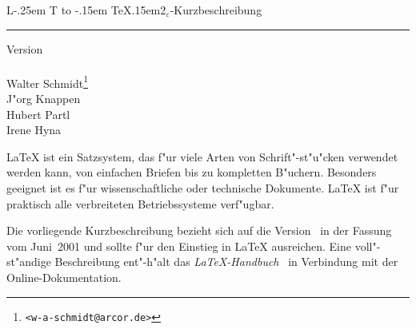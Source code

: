 \documentclass[11pt,a4paper]{article} %
\makeatletter
\DeclareRobustCommand{\sbLaTeXe}{{\fontseries{sbc}\selectfont\boldmath%
        L\kern-.25em%
        {\sbox\z@ T%
         \vbox to\ht\z@{\hbox{\check@mathfonts
                              \fontsize\sf@size\z@
                              \math@fontsfalse\selectfont
                              A}%
                        \vss}%
        }%
        \kern-.15em%
        \TeX\kern.15em2$_{\textstyle\varepsilon}$}}
\newcommand{\manual}{\emph{\LaTeX-Handbuch}~\cite{manual}}
\makeatother
\begin{document}
\begin{titlepage}
\renewcommand{\thefootnote}{\fnsymbol{footnote}}
{\Huge%
\selectfont
\raggedright
\sbLaTeXe-Kurzbeschreibung
\rule{\textwidth}{0.75pt}
\par
}
\begin{flushleft}
  \normalsize
  \selectfont
  Version \lkver\\
  \lkdate\\[2ex]
  Walter Schmidt\footnote{\texttt{<w-a-schmidt@arcor.de>}}\\
  J"org Knappen\\
  Hubert Partl%
    \\
  Irene Hyna%
  \\
\end{flushleft}

\vfill

{\parindent=0cm
\LaTeX{} ist ein Satzsystem, das f"ur viele Arten von
Schrift"-st"u"cken verwendet werden kann, von einfachen Briefen bis zu
kompletten B"uchern.  Besonders geeignet ist es f"ur 
wissenschaftliche oder technische Dokumente. \LaTeX{} ist f"ur 
praktisch alle verbreiteten Betriebssysteme verf"ugbar.
 
Die vorliegende Kurzbeschreibung bezieht sich auf die Version
\LaTeXe\ in der Fassung vom Juni~2001 und sollte f"ur den 
Einstieg in \LaTeX{} ausreichen.  
Eine voll"-st"andige Beschreibung ent"-h"alt das \manual{}
in Verbindung mit der Online-Dokumentation.
}
\setcounter{footnote}{0}
\end{titlepage}
\end{document}
